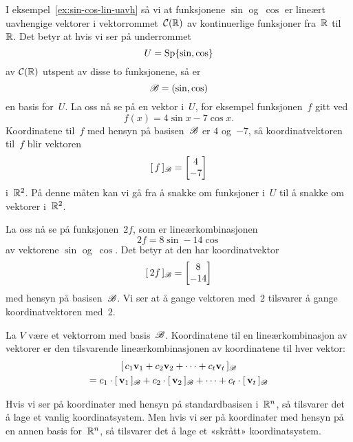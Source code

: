 \begin{ex}
I eksempel~\ref{ex:sin-cos-lin-uavh} så vi at funksjonene $\sin$
og~$\cos$ er lineært uavhengige vektorer i vektorrommet~$\mathcal{C}(\mathbb{R})$ av
kontinuerlige funksjoner fra~$\mathbb{R}$ til~$\mathbb{R}$.  Det betyr at hvis vi ser
på underrommet
\[
U = \operatorname{Sp} \{ \sin, \cos \}
\]
av $\mathcal{C}(\mathbb{R})$ utspent av disse to funksjonene, så er
\[
\mathscr{B} = (\sin, \cos)
\]
en basis for~$U$.  La oss nå se på en vektor i~$U$, for eksempel
funksjonen~$f$ gitt ved
\[
f(x) = 4 \sin x - 7 \cos x.
\]
Koordinatene til~$f$ med hensyn på basisen~$\mathscr{B}$ er $4$ og~$-7$, så
koordinatvektoren til~$f$ blir vektoren
\[
[\,{f}\,]_{\mathscr{B}} = \begin{bmatrix} 4 \\ -7 \end{bmatrix}
\]
i~$\mathbb{R}^2$.  På denne måten kan vi gå fra å snakke om funksjoner i~$U$
til å snakke om vektorer i~$\mathbb{R}^2$.

La oss nå se på funksjonen~$2f$, som er lineærkombinasjonen
\[
2f = 8 \sin - 14 \cos
\]
av vektorene $\sin$ og~$\cos$.  Det betyr at den har koordinatvektor
\[
[\,{2f}\,]_{\mathscr{B}} = \begin{bmatrix} 8 \\ -14 \end{bmatrix}
\]
med hensyn på basisen~$\mathscr{B}$.  Vi ser at å gange vektoren med~$2$
tilsvarer å gange koordinatvektoren med~$2$.
\end{ex}

\begin{thm}
\label{thm:koordinater-lin-komb}
La $V$ være et vektorrom med basis~$\mathscr{B}$.  Koordinatene til en
lineærkombinasjon av vektorer er den tilsvarende lineærkombinasjonen
av koordinatene til hver vektor:
\begin{multline*}
[\,{c_1 \mathbf{v}_1 + c_2 \mathbf{v}_2 + \cdots + c_t \mathbf{v}_t}\,]_{\mathscr{B}}\\
= c_1 \cdot [\,{\mathbf{v}_1}\,]_{\mathscr{B}} + c_2 \cdot [\,{\mathbf{v}_2}\,]_{\mathscr{B}} + \cdots + c_t \cdot [\,{\mathbf{v}_t}\,]_{\mathscr{B}}
\end{multline*}
\end{thm}

Hvis vi ser på koordinater med hensyn på standardbasisen i~$\mathbb{R}^n$, så
tilsvarer det å lage et vanlig koordinatsystem.  Men hvis vi ser på
koordinater med hensyn på en annen basis for~$\mathbb{R}^n$, så tilsvarer det
å lage et «skrått» koordinatsystem.

